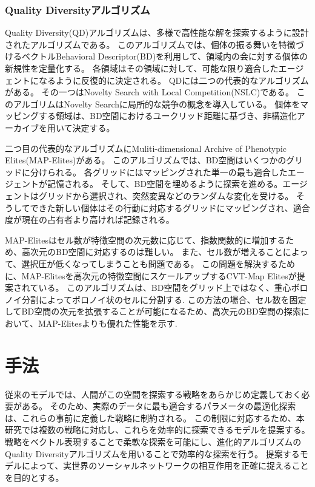 \documentclass[uplatex,11pt,openany]{ujreport}
\begin{document}
        \subsection{Quality Diversityアルゴリズム}
        Quality Diversity(QD)アルゴリズムは、多様で高性能な解を探索するように設計されたアルゴリズムである\cite{pughQualityDiversityNew2016}。
        このアルゴリズムでは、個体の振る舞いを特徴づけるベクトルBehavioral Descriptor(BD)を利用して、領域内の会に対する個体の新規性を定量化する。
        各領域はその領域に対して、可能な限り適合したエージェントになるように反復的に決定される。
        QDには二つの代表的なアルゴリズムがある。
        その一つはNovelty Search with Local Competition(NSLC)\cite{lehmanEvolvingDiversityVirtual2011}である。
        このアルゴリムはNovelty Searchに局所的な競争の概念を導入している。
        個体をマッピングする領域は、BD空間におけるユークリッド距離に基づき、非構造化アーカイブを用いて決定する。

        二つ目の代表的なアルゴリズムにMuliti-dimensional Archive of Phenotypic Elites(MAP-Elites)\cite{mouretIlluminatingSearchSpaces2015}がある。
        このアルゴリズムでは、BD空間はいくつかのグリッドに分けられる。
        各グリッドにはマッピングされた単一の最も適合したエージェントが記憶される。
        そして、BD空間を埋めるように探索を進める。エージェントはグリッドから選択され、突然変異などのランダムな変化を受ける。
        そうしてできた新しい個体はその行動に対応するグリッドにマッピングされ、適合度が現在の占有者より高ければ記録される。

        MAP-Elitesはセル数が特徴空間の次元数に応じて、指数関数的に増加するため、高次元のBD空間に対応するのは難しい。
        また、セル数が増えることによって、選択圧が低くなってしまうことも問題である。
        この問題を解決するために、MAP-Elitesを高次元の特徴空間にスケールアップするCVT-Map Elites\cite{vassiliadesUsingCentroidalVoronoi2017}が提案されている。
        このアルゴリズムは、BD空間をグリッド上ではなく、重心ボロノイ分割によってボロノイ状のセルに分割する.
        この方法の場合、セル数を固定してBD空間の次元を拡張することが可能になるため、高次元のBD空間の探索において、MAP-Elitesよりも優れた性能を示す.






\chapter{手法}
    従来のモデルでは、人間がこの空間を探索する戦略をあらかじめ定義しておく必要がある。
    そのため、実際のデータに最も適合するパラメータの最適化探索は、これらの事前に定義した戦略に制約される\cite{sudaExplorationExploitationAdjacent2022, sudaAgentbasedModelUsing2022,ubaldiEmergenceEvolutionSocial2021}。
    この制限に対応するため、本研究では複数の戦略に対応し、これらを効率的に探索できるモデルを提案する。
    戦略をベクトル表現することで柔軟な探索を可能にし、進化的アルゴリズムのQuality Diversityアルゴリズムを用いることで効率的な探索を行う。
    提案するモデルによって、実世界のソーシャルネットワークの相互作用を正確に捉えることを目的とする。
\end{document}

